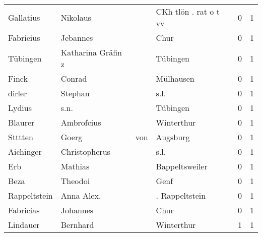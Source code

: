 \begin{tabular}{llllrr}
                Gallatius &                           Nikolaus &             &                       CKh tlön . rat o t vv &          0 &         1 \\
                Fabrieius &                           Jebannes &             &                                        Chur &          0 &         1 \\
                 Tübingen &                 Katharina Gräfin z &             &                                    Tübingen &          0 &         1 \\
                    Finck &                             Conrad &             &                                   Mülhausen &          0 &         1 \\
                   dirler &                            Stephan &             &                                        s.l. &          0 &         1 \\
                   Lydius &                               s.n. &             &                                    Tübingen &          0 &         1 \\
                  Blaurer &                         Ambrofcius &             &                                  Winterthur &          0 &         1 \\
                  Stttten &                              Goerg &         von &                                    Augsburg &          0 &         1 \\
                Aichinger &                      Christopherus &             &                                        s.l. &          0 &         1 \\
                      Erb &                            Mathias &             &                              Bappeltsweiler &          0 &         1 \\
                     Beza &                            Theodoi &             &                                        Genf &          0 &         1 \\
             Rappeltstein &                         Anna Alex. &             &                              . Rappeltstein &          0 &         1 \\
                Fabricias &                           Johannes &             &                                        Chur &          0 &         1 \\
                 Lindauer &                           Bernhard &             &                                  Winterthur &          1 &         1 \\

\end{tabular}
